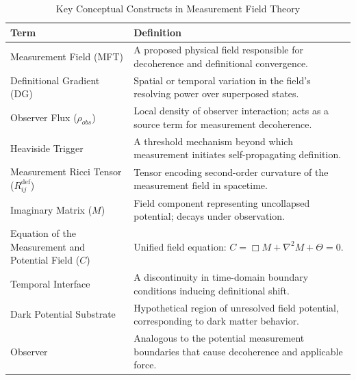 \begin{table}[p]
\centering
\small
\caption{Key Conceptual Constructs in Measurement Field Theory}
\begin{tabular}{lp{8cm}} %
\toprule
\textbf{Term} & \textbf{Definition} \\
\midrule
Measurement Field (MFT) & A proposed physical field responsible for decoherence and definitional convergence. \\
Definitional Gradient (DG) & Spatial or temporal variation in the field's resolving power over superposed states. \\
Observer Flux ($\rho_{obs}$) & Local density of observer interaction; acts as a source term for measurement decoherence. \\
Heaviside Trigger & A threshold mechanism beyond which measurement initiates self-propagating definition. \\
Measurement Ricci Tensor ($R^{\text{def}}_{ij}$) & Tensor encoding second-order curvature of the measurement field in spacetime. \\
Imaginary Matrix ($M$) & Field component representing uncollapsed potential; decays under observation. \\
Equation of the Measurement and Potential Field ($C$) & Unified field equation: $C = \Box M + \nabla^2 M + \Theta = 0$. \\
Temporal Interface & A discontinuity in time-domain boundary conditions inducing definitional shift. \\
Dark Potential Substrate & Hypothetical region of unresolved field potential, corresponding to dark matter behavior. \\
Observer & Analogous to the potential measurement boundaries that cause decoherence and applicable force. \\
\bottomrule
\end{tabular}
\label{tab:concepts}
\end{table}
